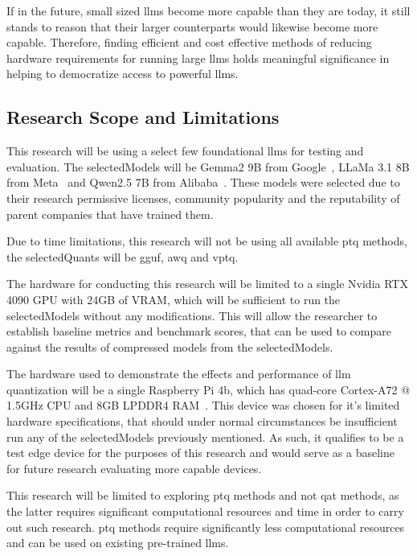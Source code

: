 \documentclass{ifacconf}
\begin{document}
	If in the future, small sized \glspl{llm} become more capable than they are today, it still stands to reason that their larger counterparts would likewise become more capable. Therefore, finding efficient and cost effective methods of reducing hardware requirements for running large \glspl{llm} holds meaningful significance in helping to democratize access to powerful \glspl{llm}.
	
	\subsection{Research Scope and Limitations}
	This research will be using a select few foundational \glspl{llm} for testing and evaluation. The \gls{selectedModels} will be Gemma2 9B from Google~\cite{gemmateam2024gemma2improvingopen}, LLaMa 3.1 8B from Meta~\cite{dubey2024llama3herdmodels} and Qwen2.5 7B from Alibaba~\cite{qwen2.5}. These models were selected due to their research permissive licenses, community popularity and the reputability of parent companies that have trained them.
	
	Due to time limitations, this research will not be using all available \gls{ptq} methods, the \gls{selectedQuants} will be \gls{gguf}, \gls{awq} and \gls{vptq}.
	
	The hardware for conducting this research will be limited to a single Nvidia RTX 4090 GPU with 24GB of VRAM, which will be sufficient to run the \gls{selectedModels} without any modifications. This will allow the researcher to establish baseline metrics and benchmark scores, that can be used to compare against the results of compressed models from the \gls{selectedModels}.
	
	The hardware used to demonstrate the effects and performance of \gls{llm} quantization will be a single Raspberry Pi 4b, which has quad-core Cortex-A72 @ 1.5GHz CPU and 8GB LPDDR4 RAM~\cite{raspberrypi4}. This device was chosen for it's limited hardware specifications, that should under normal circumstances be insufficient run any of the \gls{selectedModels} previously mentioned. As such, it qualifies to be a test edge device for the purposes of this research and would serve as a baseline for future research evaluating more capable devices.
	
	This research will be limited to exploring \gls{ptq} methods and not \gls{qat} methods, as the latter requires significant computational resources and time in order to carry out such research. \gls{ptq} methods require significantly less computational resources and can be used on existing pre-trained \glspl{llm}.
	
\end{document}
